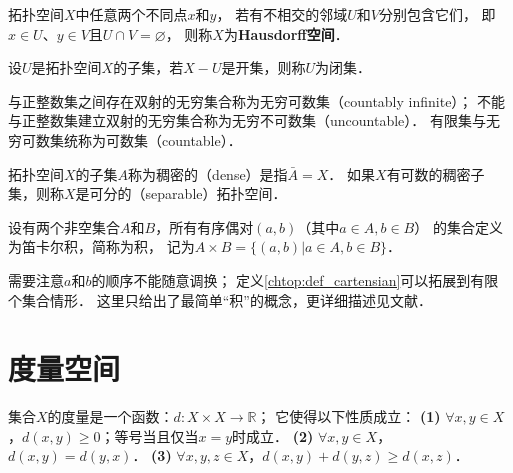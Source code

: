     
\begin{definition}\label{chtop:def_Hausdorff}
    拓扑空间$X$中任意两个不同点$x$和$y$，
    若有不相交的邻域$U$和$V$分别包含它们，
    即$x\in U$、$y\in V$且$U \cap V = \varnothing$，
    则称$X$为{\bfseries \heiti Hausdorff空间}．
\end{definition}




\begin{definition}\label{chtop:def_closedset}
    设$U$是拓扑空间$X$的子集，若$X-U$是开集，则称$U$为{\heiti 闭集}． 
\end{definition}


\begin{definition}
	与正整数集之间存在双射的无穷集合称为{\heiti 无穷可数集}（countably infinite）；
	不能与正整数集建立双射的无穷集合称为{\heiti 无穷不可数集}（uncountable）．
	有限集与无穷可数集统称为{\heiti 可数集}（countable）．
\end{definition}


  
\begin{definition}
	拓扑空间$X$的子集$A$称为{\heiti 稠密的}（dense）是指$\bar{A}=X$．
	如果$X$有可数的稠密子集，则称$X$是{\heiti 可分的}（separable）拓扑空间．
\end{definition}



\begin{definition}\label{chtop:def_cartensian}
    设有两个非空集合$A$和$B$，所有有序偶对$(a,b)$（其中$a\in A, b\in B$）
    的集合定义为{\heiti 笛卡尔积}，简称为{\heiti 积}，
    记为$A \times B = \{(a,b)| a\in A, b\in B \}$．
\end{definition}
需要注意$a$和$b$的顺序不能随意调换；
定义\ref{chtop:def_cartensian}可以拓展到有限个集合情形．
这里只给出了最简单“积”的概念，更详细描述见文献\parencite[\S 1, \S5, \S 15, \S19]{munkres-2000-topology}．





\section{度量空间}\label{chtop:sec_RmTP}

\begin{definition}\label{chtop:def_metric}
    集合$X$的{\heiti 度量}是一个函数：$d:X\times X \to \mathbb{R}$；
    它使得以下性质成立：
    {\bfseries (1)} $\forall x,y \in X$，$d(x,y) \geqslant 0$；等号当且仅当$x=y$时成立．
    {\bfseries (2)} $\forall x,y \in X$，$d(x,y) =d(y,x)$．
    {\bfseries (3)} $\forall x,y,z \in X$，$d(x,y) +d(y,z) \geqslant d(x,z)$．
\end{definition}

